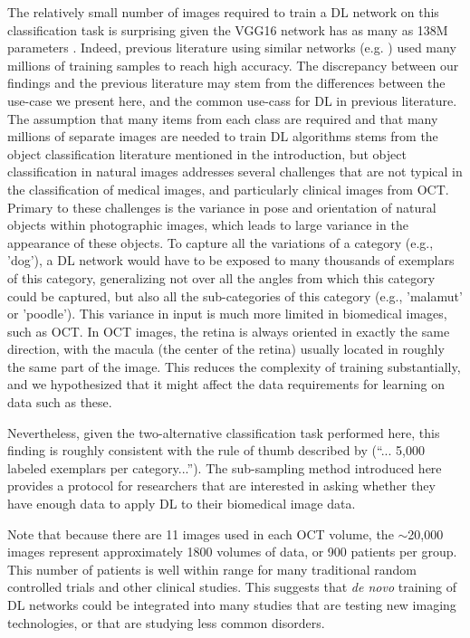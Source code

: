 The relatively small number  of images required to train a DL network on this
classification task is surprising given the VGG16 network has as many as 138M
parameters \cite{Canziani2016-ps}. Indeed, previous literature using similar
networks (e.g. \cite{Krizhevsky2012-az, Simonyan2014-al}) used many millions of
training samples to reach high accuracy. The discrepancy between our findings
and the previous literature may stem from the differences between the use-case
we present here, and the common use-cass for DL in previous literature. The
assumption that many items from each class are required and that many millions
of separate images are needed to train DL algorithms stems from the object
classification literature mentioned in the introduction, but object
classification in natural images addresses several challenges that are not
typical  in the classification of medical images, and particularly clinical
images from OCT. Primary to these challenges is the variance in pose and
orientation of natural objects within photographic images, which leads to large
variance in the appearance of these objects. To capture all the variations of a
category (e.g., 'dog'), a DL network would have to be exposed to many thousands
of exemplars of this category, generalizing not over all the angles from which
this category could be captured, but also all the sub-categories of this
category (e.g., 'malamut' or 'poodle'). This variance in input is much more
limited in biomedical images, such as OCT. In OCT images, the retina is always
oriented in exactly the same direction, with the macula (the center of the
retina) usually located in roughly the same part of the image. This reduces the
complexity of training substantially, and we hypothesized that it might affect
the data requirements for learning on data such as these.

Nevertheless, given the two-alternative classification task performed here, this
finding is roughly consistent with the rule of thumb described by
\cite{Goodfellow-et-al-2016}(``... 5,000 labeled exemplars per category...'').
The sub-sampling method introduced here provides a protocol for researchers that
are interested in asking whether they have enough data to apply DL to their
biomedical image data.

Note that because there are 11 images used in each OCT volume, the $\sim$20,000
images represent approximately 1800 volumes of data, or 900 patients per group.
This number of patients is well within range for many traditional random
controlled trials and other clinical studies. This suggests that \emph{de novo}
training of DL networks could be integrated into many studies that are testing
new imaging technologies, or that are studying less common disorders.

